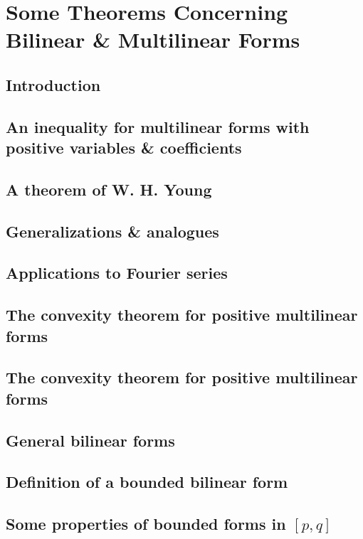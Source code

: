 \documentclass[oneside]{book}
\numberwithin{equation}{section}
\begin{document}
\section{Some Theorems Concerning Bilinear \& Multilinear Forms}

\subsection{Introduction}

\subsection{An inequality for multilinear forms with positive variables \& coefficients}

\subsection{A theorem of W. H. Young}

\subsection{Generalizations \& analogues}

\subsection{Applications to Fourier series}

\subsection{The convexity theorem for positive multilinear forms}

\subsection{The convexity theorem for positive multilinear forms}

\subsection{General bilinear forms}

\subsection{Definition of a bounded bilinear form}

\subsection{Some properties of bounded forms in $[p,q]$}
\end{document}
